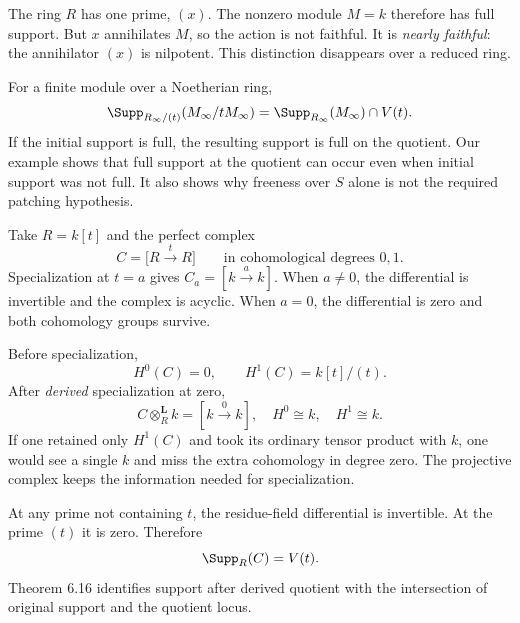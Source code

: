 The ring $R$ has one prime, $(x)$. The nonzero module $M=k$ therefore has full support. But $x$ annihilates $M$, so the action is not faithful. It is \emph{nearly faithful}: the annihilator $(x)$ is nilpotent. This distinction disappears over a reduced ring.

For a finite module over a Noetherian ring,
\[
\Supp_{R_\infty/(t)}(M_\infty/tM_\infty)
=\Supp_{R_\infty}(M_\infty)\cap V(t).
\]
If the initial support is full, the resulting support is full on the quotient. Our example shows that full support at the quotient can occur even when initial support was not full. It also shows why freeness over $S$ alone is not the required patching hypothesis.


Take $R=k[t]$ and the perfect complex
\[
C=\bigl[R\xrightarrow{\;t\;}R\bigr]
\qquad\text{in cohomological degrees }0,1.
\]
Specialization at $t=a$ gives $C_a=[k\xrightarrow{a}k]$. When $a\ne0$, the differential is invertible and the complex is acyclic. When $a=0$, the differential is zero and both cohomology groups survive.


Before specialization,
\[
H^0(C)=0,\qquad H^1(C)=k[t]/(t).
\]
After \emph{derived} specialization at zero,
\[
C\otimes_R^{\mathbf L}k=[k\xrightarrow{0}k],
\quad H^0\cong k,\quad H^1\cong k.
\]
If one retained only $H^1(C)$ and took its ordinary tensor product with $k$, one would see a single $k$ and miss the extra cohomology in degree zero. The projective complex keeps the information needed for specialization.

At any prime not containing $t$, the residue-field differential is invertible. At the prime $(t)$ it is zero. Therefore
\[
\Supp_R(C)=V(t).
\]
Theorem 6.16 identifies support after derived quotient with the intersection of original support and the quotient locus.

